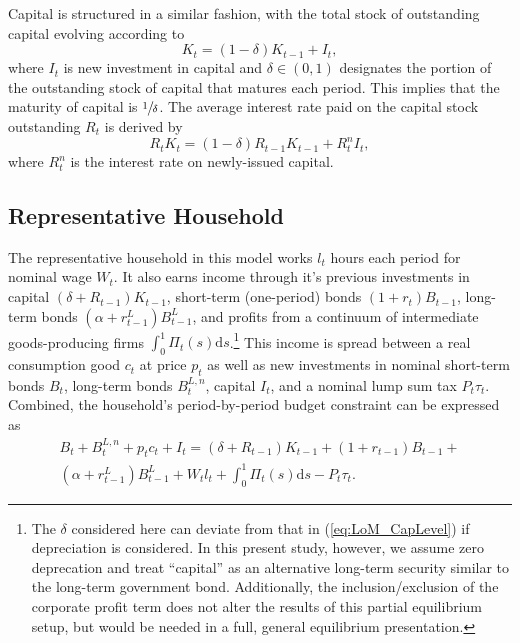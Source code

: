 \documentclass[11pt,a4paper,margin=1.5in]{article}
\begin{document}
Capital is structured in a similar fashion, with the total stock of outstanding capital evolving according to
\begin{equation}
	K_t = (1-\delta)K_{t-1} + I_t,
	\label{eq:LoM_CapLevel}
\end{equation}
where $I_t$ is new investment in capital and $\delta \in (0,1)$ designates the portion of the outstanding stock of capital that matures each period.
This implies that the maturity of capital is $\sfrac{1}{\delta}$. 
The average interest rate paid on the capital stock outstanding $R_t$ is derived by
\begin{equation}
	R_tK_t = (1-\delta)R_{t-1}K_{t-1} + R^n_tI_t,
	\label{eq:LoM_CapReturn}
\end{equation}
where $R^n_t$ is the interest rate on newly-issued capital.

\subsection{Representative Household}
The representative household in this model works $l_t$ hours each period for nominal wage $W_t$.
It also earns income through it's previous investments in capital $(\delta + R_{t-1})K_{t-1}$, short-term (one-period) bonds $(1+r_t)B_{t-1}$, long-term bonds $(\alpha + r^L_{t-1})B^L_{t-1}$, and profits from a continuum of intermediate goods-producing firms $\int^1_0 \Pi_t(s) \mathrm{d}s$.\footnote{
	The $\delta$ considered here can deviate from that in (\ref{eq:LoM_CapLevel}) if depreciation is considered.
	In this present study, however, we assume zero deprecation and treat ``capital'' as an alternative long-term security similar to the long-term government bond.
	Additionally, the inclusion/exclusion of the corporate profit term does not alter the results of this partial equilibrium setup, but would be needed in a full, general equilibrium presentation.}
This income is spread between a real consumption good $c_t$ at price $p_t$ as well as new investments in nominal short-term bonds $B_t$, long-term bonds $B^{L,n}_t$, capital $I_t$, and a nominal lump sum tax $P_t\tau_t$.
Combined, the household's period-by-period budget constraint can be expressed as
\begin{multline}
	B_t + B^{L,n}_t + p_tc_t + I_t = (\delta + R_{t-1})K_{t-1} + (1+r_{t-1})B_{t-1} + \\ (\alpha + r^L_{t-1})B^L_{t-1} + W_tl_t + \int^1_0\Pi_t(s)\text{d}s - P_t\tau_t.
	\label{eq:HH_Budget}
\end{multline}
\end{document}
